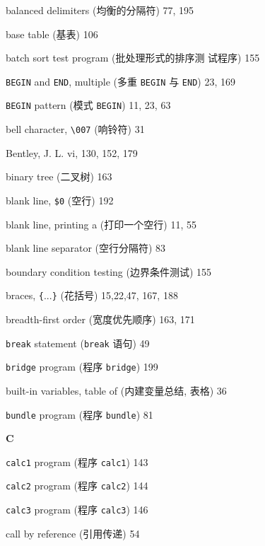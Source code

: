 \begin{multicols}{2}
\hangindent=2pc  balanced delimiters (均衡的分隔符) 77, 195

\hangindent=2pc  base table (基表) 106

\hangindent=2pc  batch sort test program (批处理形式的排序测
试程序) 155

\hangindent=2pc  \verb'BEGIN' and \verb'END', multiple (多重
\verb'BEGIN' 与 \verb'END') 23, 169

\hangindent=2pc  \verb'BEGIN' pattern (模式 \verb'BEGIN') 11, 23, 63

\hangindent=2pc  bell character, \verb'\007' (响铃符) 31

\hangindent=2pc  Bentley, J. L. vi, 130, 152, 179

\hangindent=2pc  binary tree (二叉树) 163

\hangindent=2pc  blank line, \verb'$0' (空行) 192

\hangindent=2pc  blank line, printing a (打印一个空行) 11, 55

\hangindent=2pc  blank line separator (空行分隔符) 83

\hangindent=2pc  boundary condition testing (边界条件测试) 155

\hangindent=2pc  braces, \verb'{'...\verb'}' (花括号) 15,22,47, 167, 188

\hangindent=2pc  breadth-first order (宽度优先顺序) 163, 171

\hangindent=2pc  \verb'break' statement (\verb'break' 语句) 49

\hangindent=2pc  \verb'bridge' program (程序 \verb'bridge') 199

\hangindent=2pc  built-in variables, table of (内建变量总结, 
表格) 36

\hangindent=2pc  \verb'bundle' program (程序 \verb'bundle') 81

\medskip\textbf{\large{C}}

\hangindent=2pc  \verb'calc1' program (程序 \verb'calc1') 143

\hangindent=2pc  \verb'calc2' program (程序 \verb'calc2') 144

\hangindent=2pc  \verb'calc3' program (程序 \verb'calc3') 146

\hangindent=2pc  call by reference (引用传递) 54


\end{multicols}
